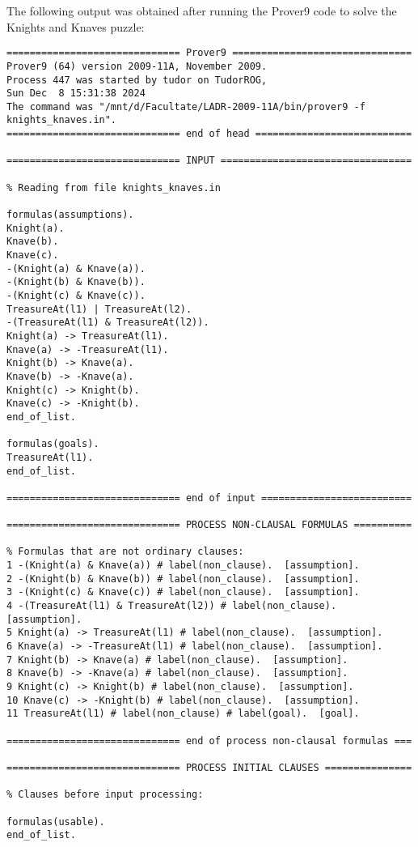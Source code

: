 \documentclass[a4paper,12pt]{article}
\begin{document}
The following output was obtained after running the Prover9 code to solve the Knights and Knaves puzzle:

\begin{lstlisting}[language=Prover9]
============================== Prover9 ===============================
Prover9 (64) version 2009-11A, November 2009.
Process 447 was started by tudor on TudorROG,
Sun Dec  8 15:31:38 2024
The command was "/mnt/d/Facultate/LADR-2009-11A/bin/prover9 -f knights_knaves.in".
============================== end of head ===========================

============================== INPUT =================================

% Reading from file knights_knaves.in

formulas(assumptions).
Knight(a).
Knave(b).
Knave(c).
-(Knight(a) & Knave(a)).
-(Knight(b) & Knave(b)).
-(Knight(c) & Knave(c)).
TreasureAt(l1) | TreasureAt(l2).
-(TreasureAt(l1) & TreasureAt(l2)).
Knight(a) -> TreasureAt(l1).
Knave(a) -> -TreasureAt(l1).
Knight(b) -> Knave(a).
Knave(b) -> -Knave(a).
Knight(c) -> Knight(b).
Knave(c) -> -Knight(b).
end_of_list.

formulas(goals).
TreasureAt(l1).
end_of_list.

============================== end of input ==========================

============================== PROCESS NON-CLAUSAL FORMULAS ==========

% Formulas that are not ordinary clauses:
1 -(Knight(a) & Knave(a)) # label(non_clause).  [assumption].
2 -(Knight(b) & Knave(b)) # label(non_clause).  [assumption].
3 -(Knight(c) & Knave(c)) # label(non_clause).  [assumption].
4 -(TreasureAt(l1) & TreasureAt(l2)) # label(non_clause).  [assumption].
5 Knight(a) -> TreasureAt(l1) # label(non_clause).  [assumption].
6 Knave(a) -> -TreasureAt(l1) # label(non_clause).  [assumption].
7 Knight(b) -> Knave(a) # label(non_clause).  [assumption].
8 Knave(b) -> -Knave(a) # label(non_clause).  [assumption].
9 Knight(c) -> Knight(b) # label(non_clause).  [assumption].
10 Knave(c) -> -Knight(b) # label(non_clause).  [assumption].
11 TreasureAt(l1) # label(non_clause) # label(goal).  [goal].

============================== end of process non-clausal formulas ===

============================== PROCESS INITIAL CLAUSES ===============

% Clauses before input processing:

formulas(usable).
end_of_list.


\end{lstlisting}
\end{document}
